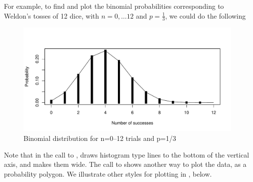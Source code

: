 \documentclass[11pt]{book}
\renewenvironment{knitrout}{\small\renewcommand{\baselinestretch}{.85}}{} %
\begin{document}
For example, to find and plot the binomial probabilities corresponding
to Weldon's tosses of 12 dice, with $n=0, \dots 12$ and $p=\frac13$,
we could do the following
\begin{knitrout}
\color{fgcolor}\begin{kframe}
\begin{alltt}
 \hlkwb{<-} \hlstd{(}\hlstd{,} \hlstd{)}
\hlstd{(} \hlstd{=}\hlstd{,}\hlopt{/}\hlstd{),} \hlstd{=}\hlstd{,}
  \hlstd{=}\hlstd{,} \hlstd{=}\hlstd{,}
        \hlstd{=}\hlstd{,} \hlstd{=}\hlstd{)}
\hlstd{(} \hlstd{=}\hlstd{,}\hlopt{/}\hlstd{))}
\end{alltt}
\end{kframe}\begin{figure}[!htbp]


\centerline{\includegraphics[width=.75\textwidth]{ch03/fig/dbinom1} }

\caption[Binomial distribution for n=0--12 trials and p=1/3]{Binomial distribution for n=0--12 trials and p=1/3\label{fig:dbinom1}}
\end{figure}


\end{knitrout}
Note that in the call to ,  draws histogram type
lines to the bottom of the vertical axis, and  makes them wide.
The call to  shows another way to plot the data, as a probability
polygon. We illustrate other styles for plotting in ,
 below.
\end{document}

